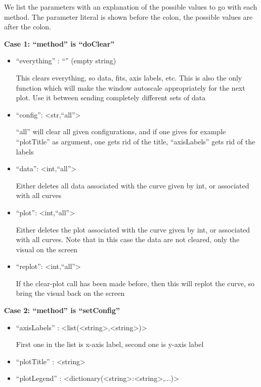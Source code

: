 \documentclass[11pt]{article} %
\begin{document}
\begin{tcolorbox}[breakable,title=Sending ``params'' to the server]

We list the parameters with an explanation of the possible values to go with each method. The parameter literal is shown before the colon, the possible values are after the colon.

\textbf{Case 1: ``method'' is ``doClear''}
\begin{itemize}
\item ``everything'' : ``'' (empty string) 

This clears everything, so data, fits, axis labels, etc. This is also the only function which will make the window 
autoscale appropriately for the next plot. Use it between sending completely different sets of data

\item ``config'': <str,``all''> 

``all'' will clear all given configurations, and if one gives for example ``plotTitle'' as argument, one gets rid
of the title, ``axisLabels'' gets rid of the labels

\item ``data'': <int,``all''> 

Either deletes all data associated with the curve given by int, or associated with all curves

\item ``plot'': <int,``all''>

Either deletes the plot associated with the curve given by int, or associated with all curves. 
Note that in this case the data are not cleared, only the visual on the screen

\item ``replot'': <int,``all''>

If the clear-plot call has been made before, then this will replot the curve, so bring the visual back on the screen

\end{itemize}
\textbf{Case 2: ``method'' is ``setConfig''}
\begin{itemize}

\item ``axisLabels'' : <list(<string>,<string>)> 

First one in the list is x-axis label, second one is y-axis label

\item ``plotTitle'' : <string>

\item ``plotLegend'' : <dictionary(<string>:<string>,...)> 


\end{itemize}
\end{tcolorbox}
\end{document}
